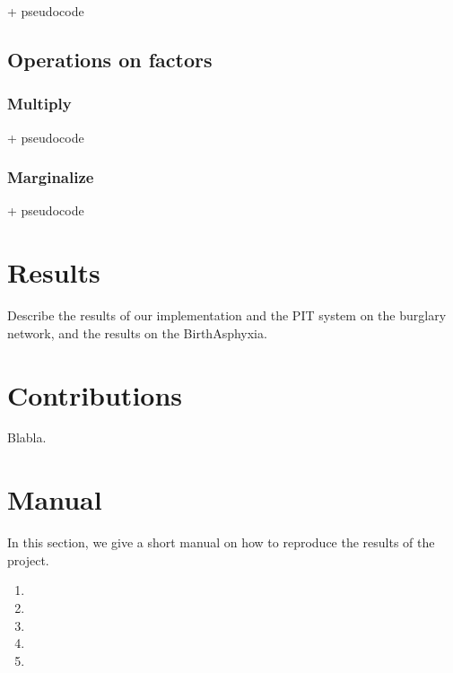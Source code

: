 \documentclass[10pt,a4paper]{article}
\begin{document}
+ pseudocode

\subsection{Operations on factors}
\subsubsection{Multiply}
+ pseudocode
\subsubsection{Marginalize}
+ pseudocode
\section{Results}
Describe the results of our implementation and the PIT system on the burglary network, and the results on the BirthAsphyxia.

\section{Contributions}
Blabla.
\section{Manual}
In this section, we give a short manual on how to reproduce the results of the project. 

\begin{enumerate}
\item 
\item 
\item 
\item 
\item 
\end{enumerate}
\end{document}
